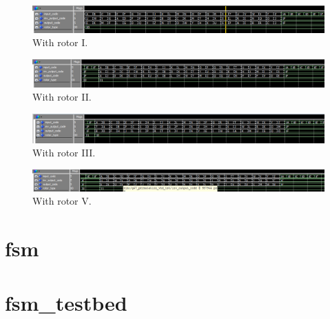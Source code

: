 \documentclass[10pt]{article}
\begin{document}
\begin{figure}[!htb]
    \centering
    \includegraphics[width=1\textwidth]{./perm_2.png}
    \caption{With rotor I.}
    \label{fig:perm_2}
\end{figure}
\begin{figure}[!htb]
    \centering
    \includegraphics[width=1\textwidth]{./perm_3.png}
    \caption{With rotor II.}
    \label{fig:perm_3}
\end{figure}
\begin{figure}[!htb]
    \centering
    \includegraphics[width=1\textwidth]{./perm_4.png}
    \caption{With rotor III.}
    \label{fig:perm_4}
\end{figure}
\begin{figure}[!htb]
    \centering
    \includegraphics[width=1\textwidth]{./perm_5.png}
    \caption{With rotor V.}
    \label{fig:perm_5}
\end{figure}

\section{fsm}

\section{fsm\_testbed}
\end{document}

